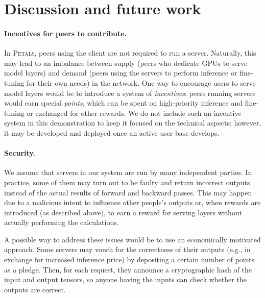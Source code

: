 \section{Discussion and future work}\label{sect:discussion}\label{sect:incentives}

\paragraph{Incentives for peers to contribute.}
In \textsc{Petals}, peers using the client are not required to run a server. Naturally, this may lead to an imbalance between supply (peers who dedicate GPUs to serve model layers) and demand (peers using the servers to perform inference or fine-tuning for their own needs) in the network.
One way to encourage users to serve model layers would be to introduce a system of \textit{incentives}: peers running servers would earn special \textit{points}, which can be spent on high-priority inference and fine-tuning or exchanged for other rewards.
We do not include such an incentive system in this demonstration to keep it focused on the technical aspects; however, it may be developed and deployed once an active user base develops.

\paragraph{Security.}
We assume that servers in our system are run by many independent parties. In practice, some of them may turn out to be faulty and return incorrect outputs instead of the actual results of forward and backward passes. This may happen due to a malicious intent to influence other people's outputs or, when rewards are introduced (as described above), to earn a reward for serving layers without actually performing the calculations.

A possible way to address these issues would be to use an economically motivated approach.
Some servers may vouch for the correctness of their outputs (e.g., in exchange for increased inference price) by depositing a certain number of points as a pledge. Then, for each request, they announce a cryptographic hash of the input and output tensors, so anyone having the inputs can check whether the outputs are correct.

